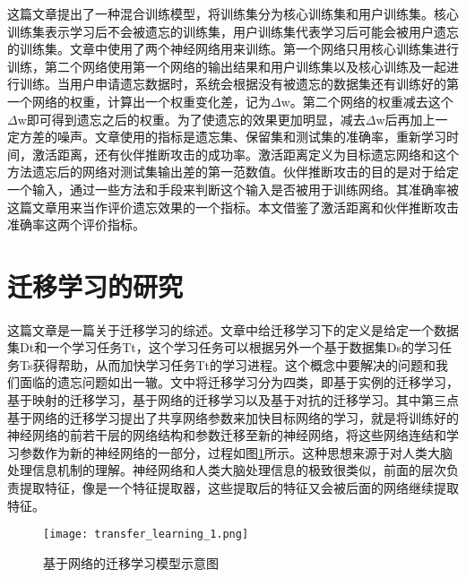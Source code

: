 这篇文章\cite{Golatkar_2021_CVPR}提出了一种混合训练模型，将训练集分为核心训练集和用户训练集。核心训练集表示学习后不会被遗忘的训练集，用户训练集代表学习后可能会被用户遗忘的训练集。文章中使用了两个神经网络用来训练。第一个网络只用核心训练集进行训练，第二个网络使用第一个网络的输出结果和用户训练集以及核心训练及一起进行训练。当用户申请遗忘数据时，系统会根据没有被遗忘的数据集还有训练好的第一个网络的权重，计算出一个权重变化差，记为$\Delta$w。第二个网络的权重减去这个$\Delta$w即可得到遗忘之后的权重。为了使遗忘的效果更加明显，减去$\Delta$w后再加上一定方差的噪声。文章使用的指标是遗忘集、保留集和测试集的准确率，重新学习时间，激活距离，还有伙伴推断攻击的成功率。激活距离定义为目标遗忘网络和这个方法遗忘后的网络对测试集输出差的第一范数值。伙伴推断攻击的目的是对于给定一个输入，通过一些方法和手段来判断这个输入是否被用于训练网络。其准确率被这篇文章用来当作评价遗忘效果的一个指标。本文借鉴了激活距离和伙伴推断攻击准确率这两个评价指标。
\section{迁移学习的研究}
\paragraph{}这篇文章\cite{10.1007/978-3-030-01424-7_27}是一篇关于迁移学习的综述。文章中给迁移学习下的定义是给定一个数据集Dt和一个学习任务Tt，这个学习任务可以根据另外一个基于数据集Ds的学习任务Ts获得帮助，从而加快学习任务Tt的学习进程。这个概念中要解决的问题和我们面临的遗忘问题如出一辙。文中将迁移学习分为四类，即基于实例的迁移学习，基于映射的迁移学习，基于网络的迁移学习以及基于对抗的迁移学习。其中第三点基于网络的迁移学习提出了共享网络参数来加快目标网络的学习，就是将训练好的神经网络的前若干层的网络结构和参数迁移至新的神经网络，将这些网络连结和学习参数作为新的神经网络的一部分，过程如图\ref{fig:transfer_learning_1}所示。这种思想来源于对人类大脑处理信息机制的理解。神经网络和人类大脑处理信息的极致很类似，前面的层次负责提取特征，像是一个特征提取器，这些提取后的特征又会被后面的网络继续提取特征。
\begin{figure}
    \centering
    \texttt{[image: transfer\_learning\_1.png]}
    \caption{基于网络的迁移学习模型示意图}
    \label{fig:transfer_learning_1}
\end{figure}
